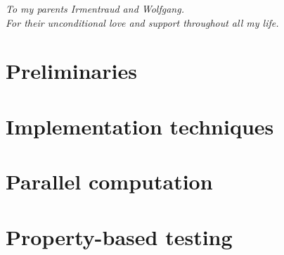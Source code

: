 \documentclass[oneside]{book}
\begin{document}
%

\clearpage
\begin{center}
    \thispagestyle{empty}
    \vspace*{\fill}
    \textit{To my parents Irmentraud and Wolfgang. \\ For their unconditional love and support throughout all my life.}
    \vspace*{\fill}
\end{center}

\clearpage


\epigraphhead[450]{}
\part{Preliminaries}
\label{part:preliminaries}




\epigraphhead[450]{}
\part{Implementation techniques}
\label{part:implementation}



\epigraphhead[450]{}
\part{Parallel computation}
\label{part:parallel}


\epigraphhead[450]{}
\part{Property-based testing}
\label{part:property}

\end{document}

